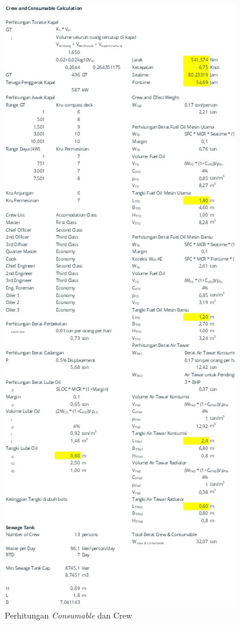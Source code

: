 \begin{figure}[!ht]
    \centering
    \includegraphics[width=0.95\linewidth,height=0.95\textheight,keepaspectratio]{lampiran/deskap-7.jpg}
    \caption*{Perhitungan \emph{Consumable} dan Crew}
\end{figure}

